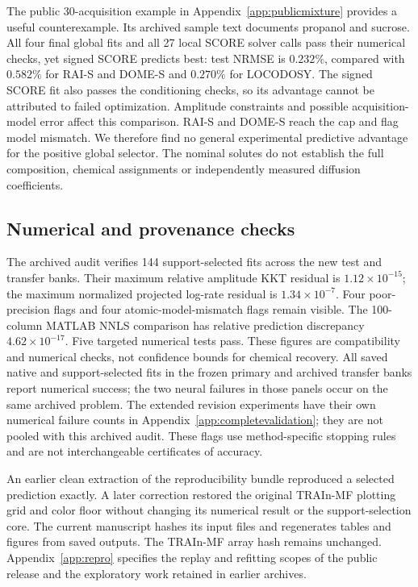 The public 30-acquisition example in Appendix~\ref{app:publicmixture} provides
a useful counterexample. Its archived sample text documents propanol and sucrose.
All four final global fits and all 27 local SCORE solver calls pass their numerical
checks, yet signed SCORE predicts best: test NRMSE is $0.232\%$, compared with
$0.582\%$ for RAI-S and DOME-S and $0.270\%$ for LOCODOSY. The signed SCORE fit
also passes the conditioning checks, so its advantage cannot be attributed to
failed optimization. Amplitude constraints and possible acquisition-model error
affect this comparison. RAI-S and DOME-S reach the cap and flag model mismatch.
We therefore find no general experimental predictive advantage for the positive
global selector. The nominal solutes do not establish the full composition,
chemical assignments or independently measured diffusion coefficients.

\subsection{Numerical and provenance checks}
The archived audit verifies 144 support-selected fits across the new test and transfer banks. Their maximum relative amplitude KKT residual is $1.12\times10^{-15}$; the maximum normalized projected log-rate residual is $1.34\times10^{-7}$. Four poor-precision flags and four atomic-model-mismatch flags remain visible. The 100-column MATLAB NNLS comparison has relative prediction discrepancy $4.62\times10^{-17}$. Five targeted numerical tests pass. These figures are compatibility and numerical checks, not confidence bounds for chemical recovery. All saved native and support-selected fits in the frozen primary and archived transfer banks report numerical success; the two neural failures in those panels occur on the same archived problem. The extended revision experiments have their own numerical failure counts in Appendix~\ref{app:completevalidation}; they are not pooled with this archived audit. These flags use method-specific stopping rules and are not interchangeable certificates of accuracy.

An earlier clean extraction of the reproducibility bundle reproduced a selected prediction exactly. A later correction restored the original TRAIn-MF plotting grid and color floor without changing its numerical result or the support-selection core. The current manuscript hashes its input files and regenerates tables and figures from saved outputs. The TRAIn-MF array hash remains unchanged. Appendix~\ref{app:repro} specifies the replay and refitting scopes of the public release and the exploratory work retained in earlier archives.
